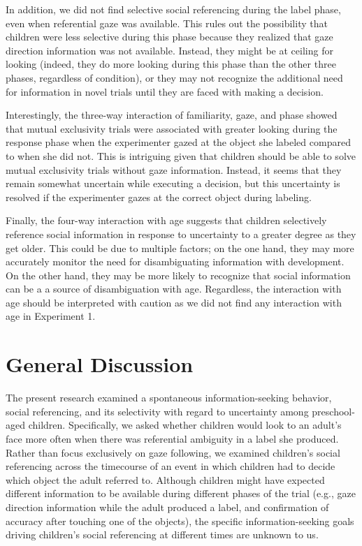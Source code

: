 \documentclass[10pt, letterpaper]{article}
\begin{document}
In addition, we did not find selective social referencing during the
label phase, even when referential gaze was available. This rules out
the possibility that children were less selective during this phase
because they realized that gaze direction information was not available.
Instead, they might be at ceiling for looking (indeed, they do more
looking during this phase than the other three phases, regardless of
condition), or they may not recognize the additional need for
information in novel trials until they are faced with making a decision.

Interestingly, the three-way interaction of familiarity, gaze, and phase
showed that mutual exclusivity trials were associated with greater
looking during the response phase when the experimenter gazed at the
object she labeled compared to when she did not. This is intriguing
given that children should be able to solve mutual exclusivity trials
without gaze information. Instead, it seems that they remain somewhat
uncertain while executing a decision, but this uncertainty is resolved
if the experimenter gazes at the correct object during labeling.

Finally, the four-way interaction with age suggests that children
selectively reference social information in response to uncertainty to a
greater degree as they get older. This could be due to multiple factors;
on the one hand, they may more accurately monitor the need for
disambiguating information with development. On the other hand, they may
be more likely to recognize that social information can be a a source of
disambiguation with age. Regardless, the interaction with age should be
interpreted with caution as we did not find any interaction with age in
Experiment 1.

\section{General Discussion}\label{general-discussion}

The present research examined a spontaneous information-seeking
behavior, social referencing, and its selectivity with regard to
uncertainty among preschool-aged children. Specifically, we asked
whether children would look to an adult's face more often when there was
referential ambiguity in a label she produced. Rather than focus
exclusively on gaze following, we examined children's social referencing
across the timecourse of an event in which children had to decide which
object the adult referred to. Although children might have expected
different information to be available during different phases of the
trial (e.g., gaze direction information while the adult produced a
label, and confirmation of accuracy after touching one of the objects),
the specific information-seeking goals driving children's social
referencing at different times are unknown to us.
\end{document}
